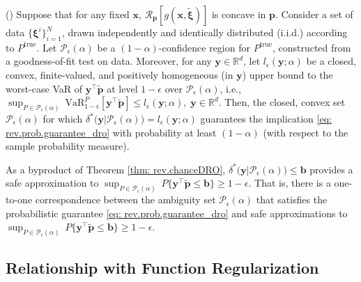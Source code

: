 \documentclass[final,onefignum,onetabnum]{class}
\newcommand{\vvvar}[3]{\mathrm{VaR}^{#1}_{#2} \left[ #3 \right]}
\newcommand{\rrisk}[2]{\Cs{R}_{#1} \left[ #2 \right]}
\newcommand{\bs}[1]{\boldsymbol{#1}} %
\newcommand{\Bs}[1]{\mathbb{#1}} %
\newcommand{\Cs}[1]{\mathcal{#1}} %
\newcommand{\txi}{\tilde{\bs{\xi}}}
\newcommand{\tbs}[1]{\tilde{\bs{#1}}}
\newcommand{\dro}{DRO}
\begin{document}
\begin{theorem}{(\citet[Theorem~2]{bertsimas2018RO})}
    \label{thm: rev.chanceDRO}
    Suppose that for any fixed $\bs{x}$, $\rrisk{\bs{p}}{g(\bs{x}, \txi)}$ is concave in $\bs{p}$. Consider a set of   data $\{\bs{\xi}^{i}\}_{i=1}^{N}$, drawn independently and identically distributed (i.i.d.) according to $P^{\text{true}}$. Let $\Cs{P}_{\epsilon}(\alpha)$ be a $(1-\alpha)$-confidence region for $P^{\text{true}}$, constructed from a goodness-of-fit test on data. Moreover, for any $\bs{y} \in \Bs{R}^{d}$, let $l_{\epsilon}(\bs{y}; \alpha)$ be a closed, convex, finite-valued, and positively homogeneous (in $\bs{y}$) upper bound to the worst-case VaR of $\bs{y}^{\top} \tbs{p}$ at level $1-\epsilon$ over $\Cs{P}_{\epsilon}(\alpha)$, i.e., $\sup_{P \in \Cs{P}_{\epsilon}(\alpha)} \ \vvvar{P}{1-\epsilon}{\bs{y}^{\top} \tbs{p}} \le l_{\epsilon}(\bs{y}; \alpha), \; \bs{y} \in \Bs{R}^{d}$. 
    Then, the closed, convex set $\Cs{P}_{\epsilon}(\alpha)$ for which $\delta^{*}\big(\bs{y} | \Cs{P}_{\epsilon}(\alpha)\big)= l_{\epsilon}(\bs{y}; \alpha)$ guarantees the implication \eqref{eq: rev.prob.guarantee_dro} with probability at least $(1-\alpha)$ (with respect to the sample probability measure). 
\end{theorem}
As a byproduct of Theorem \ref{thm: rev.chanceDRO}, $\delta^{*}\big(\bs{y} | \Cs{P}_{\epsilon}(\alpha)\big) \le \bs{b}$ provides a safe approximation to \linebreak $\sup_{P \in \Cs{P}_{\epsilon}(\alpha)} \ P\{\bs{y}^{\top} \tbs{p} \le \bs{b}\} \ge 1-\epsilon$. That is, there is a one-to-one correspondence between the ambiguity set $\Cs{P}_{\epsilon}(\alpha)$ that satisfies the probabilistic guarantee \eqref{eq: rev.prob.guarantee_dro} and safe approximations to $\sup_{P \in \Cs{P}_{\epsilon}(\alpha)} \ P\{\bs{y}^{\top} \tbs{p} \le \bs{b}\} \ge 1-\epsilon$. %








\subsection{Relationship with Function Regularization}
\label{sec: rev.rel_regularization}
\end{document}
